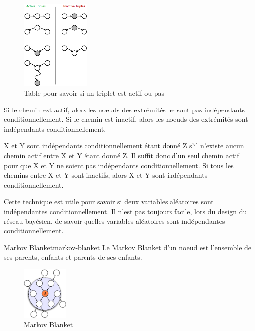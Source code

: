 \begin{figure}[H]
    \begin{center}
        \includegraphics[width=0.3\textwidth]{pictures/triplet.png}
    \end{center}
    \caption{Table pour savoir si un triplet est actif ou pas}\label{fig:triplet}
\end{figure}

Si le chemin est actif, alors les noeuds des extrémités ne sont pas indépendants conditionnellement. 
Si le chemin est inactif, alors les noeuds des extrémités sont indépendants conditionnellement.

X et Y sont indépendants conditionnellement étant donné Z s'il n'existe aucun chemin actif entre X et Y étant donné Z.
Il suffit donc d'un seul chemin actif pour que X et Y ne soient pas indépendants conditionnellement.
Si tous les chemins entre X et Y sont inactifs, alors X et Y sont indépendants conditionnellement.


\begin{remark}\leavevmode
    Cette technique est utile pour savoir si deux variables aléatoires sont indépendantes conditionnellement. 
    Il n'est pas toujours facile, lors du design du réseau bayésien, de savoir quelles variables aléatoires sont indépendantes conditionnellement.
\end{remark}

\begin{definition}{Markov Blanket}{markov-blanket}
    Le Markov Blanket d'un noeud est l'ensemble de ses parents, enfants et parents de ses enfants.
    \begin{figure}[H]
        \begin{center}
            \includegraphics[width=0.2\textwidth]{pictures/markovblanckets.png}
        \end{center}
        \caption{Markov Blanket}\label{fig:markov-blanket}
    \end{figure}
\end{definition}

